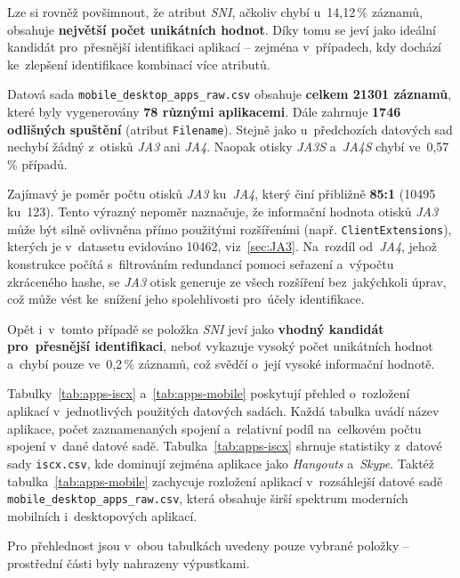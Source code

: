 Lze si rovněž povšimnout, že atribut \textit{SNI}, ačkoliv chybí u~14,12\,\% záznamů, obsahuje \textbf{největší počet unikátních hodnot}. Díky tomu se jeví jako ideální kandidát pro~přesnější identifikaci aplikací -- zejména v~případech, kdy dochází ke~zlepšení identifikace kombinací více atributů.

Datová sada \texttt{mobile\_desktop\_apps\_raw.csv} obsahuje \textbf{celkem 21301 záznamů}, které byly vygenerovány \textbf{78 různými aplikacemi}. Dále zahrnuje \textbf{1746 odlišných spuštění} (atribut \texttt{Filename}). Stejně jako u~předchozích datových sad nechybí žádný z~otisků \textit{JA3} ani \textit{JA4}. Naopak otisky \textit{JA3S} a~\textit{JA4S} chybí ve~0,57\,\% případů.

Zajímavý je poměr počtu otisků \textit{JA3} ku~\textit{JA4}, který činí přibližně \textbf{85:1} (10495 ku~123). Tento výrazný nepoměr naznačuje, že informační hodnota otisků \textit{JA3} může být silně ovlivněna přímo použitými rozšířeními (např. \texttt{ClientExtensions}), kterých je v~datasetu evidováno 10462, viz~\ref{sec:JA3}. Na~rozdíl od~\textit{JA4}, jehož konstrukce počítá s~filtrováním redundancí pomoci seřazení a~výpočtu zkráceného hashe, se \textit{JA3} otisk generuje ze všech rozšíření bez~jakýchkoli úprav, což může vést ke~snížení jeho spolehlivosti pro~účely identifikace.

Opět i~v~tomto případě se položka \textit{SNI} jeví jako \textbf{vhodný kandidát pro~přesnější identifikaci}, neboť vykazuje vysoký počet unikátních hodnot a~chybí pouze ve~0,2\,\% záznamů, což svědčí o~její vysoké informační hodnotě.

Tabulky~\ref{tab:apps-iscx} a~\ref{tab:apps-mobile} poskytují přehled o~rozložení aplikací v~jednotlivých použitých datových sadách. Každá tabulka uvádí název aplikace, počet zaznamenaných spojení a~relativní podíl na~celkovém počtu spojení v~dané datové sadě.
Tabulka~\ref{tab:apps-iscx} shrnuje statistiky z~datové sady \texttt{iscx.csv}, kde dominují zejména aplikace jako \textit{Hangouts} a~\textit{Skype}.
Taktéž tabulka~\ref{tab:apps-mobile} zachycuje rozložení aplikací v~rozsáhlejší datové sadě \texttt{mobile\_desktop\_apps\_raw.csv}, která obsahuje širší spektrum moderních mobilních i~desktopových aplikací.

Pro přehlednost jsou v~obou tabulkách uvedeny pouze vybrané položky -- prostřední části byly nahrazeny výpustkami.

